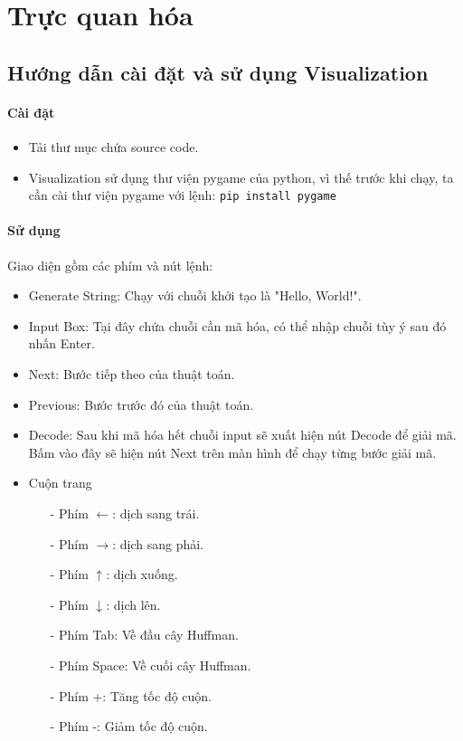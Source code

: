 \chapter{Trực quan hóa}
\section{Hướng dẫn cài đặt và sử dụng Visualization}

\subsubsection{Cài đặt}
    \begin{itemize}
        \item Tải thư mục chứa source code.
        \item Visualization sử dụng thư viện pygame của python, vì thế trước khi chạy, ta cần cài thư viện pygame với lệnh: \lstinline{pip install pygame}
    \end{itemize}
\subsubsection{Sử dụng}
Giao diện gồm các phím và nút lệnh:
    \begin{itemize}
        \item Generate String: Chạy với chuỗi khởi tạo là "Hello, World!".
        \item Input Box: Tại đây chứa chuỗi cần mã hóa, có thể nhập chuỗi tùy ý sau đó nhấn Enter.
        \item Next: Bước tiếp theo của thuật toán.
        \item Previous: Bước trước đó của thuật toán.
        \item Decode: Sau khi mã hóa hết chuỗi input sẽ xuất hiện nút Decode để giải mã. Bấm vào đây sẽ hiện nút Next trên màn hình để chạy từng bước giải mã.
        \item Cuộn trang
        \begin{itemize}
            \item[-] Phím $\leftarrow$: dịch sang trái.
            \item[-] Phím $\rightarrow$: dịch sang phải.
            \item[-] Phím $\uparrow$: dịch xuống.
            \item[-] Phím $\downarrow$: dịch lên.
            \item[-] Phím Tab: Về đầu cây Huffman.
            \item[-] Phím Space: Về cuối cây Huffman.
            \item[-] Phím +: Tăng tốc độ cuộn.
            \item[-] Phím -: Giảm tốc độ cuộn.
        \end{itemize}
        
    \end{itemize}
